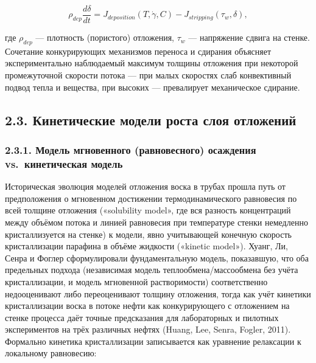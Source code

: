 \documentclass[11pt]{extarticle}
\begin{document}
\[
\rho_{dep}\frac{d\delta}{dt} = J_{deposition}(T, \dot\gamma, C) - J_{stripping}(\tau_w, \delta),
\]

где \(\rho_{dep}\) --- плотность (пористого) отложения, \(\tau_w\) --- напряжение сдвига на стенке. Сочетание конкурирующих механизмов переноса и сдирания объясняет экспериментально наблюдаемый максимум толщины отложения при некоторой промежуточной скорости потока --- при малых скоростях слаб конвективный подвод тепла и вещества, при высоких --- превалирует механическое сдирание.

\subsection{2.3. Кинетические модели роста слоя отложений}\label{ux43aux438ux43dux435ux442ux438ux447ux435ux441ux43aux438ux435-ux43cux43eux434ux435ux43bux438-ux440ux43eux441ux442ux430-ux441ux43bux43eux44f-ux43eux442ux43bux43eux436ux435ux43dux438ux439}

\subsubsection{2.3.1. Модель мгновенного (равновесного) осаждения vs.~кинетическая модель}\label{ux43cux43eux434ux435ux43bux44c-ux43cux433ux43dux43eux432ux435ux43dux43dux43eux433ux43e-ux440ux430ux432ux43dux43eux432ux435ux441ux43dux43eux433ux43e-ux43eux441ux430ux436ux434ux435ux43dux438ux44f-vs.-ux43aux438ux43dux435ux442ux438ux447ux435ux441ux43aux430ux44f-ux43cux43eux434ux435ux43bux44c}

Историческая эволюция моделей отложения воска в трубах прошла путь от предположения о мгновенном достижении термодинамического равновесия по всей толщине отложения («solubility model», где вся разность концентраций между объёмом потока и линией равновесия при температуре стенки немедленно кристаллизуется на стенке) к модели, явно учитывающей конечную скорость кристаллизации парафина в объёме жидкости («kinetic model»). Хуанг, Ли, Сенра и Фоглер сформулировали фундаментальную модель, показавшую, что оба предельных подхода (независимая модель теплообмена/массообмена без учёта кристаллизации, и модель мгновенной растворимости) соответственно недооценивают либо переоценивают толщину отложения, тогда как учёт кинетики кристаллизации воска в потоке нефти как конкурирующего с отложением на стенке процесса даёт точные предсказания для лабораторных и пилотных экспериментов на трёх различных нефтях (Huang, Lee, Senra, Fogler, 2011). Формально кинетика кристаллизации записывается как уравнение релаксации к локальному равновесию:
\end{document}
